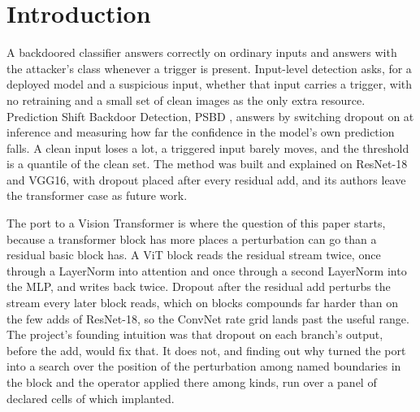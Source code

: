 \documentclass[../main.tex]{subfiles}
\begin{document}
\section{Introduction}

A backdoored classifier answers correctly on ordinary inputs and answers with the attacker's class whenever a trigger is present. Input-level detection asks, for a deployed model and a suspicious input, whether that input carries a trigger, with no retraining and a small set of clean images as the only extra resource. Prediction Shift Backdoor Detection, PSBD \citep{li2025psbd}, answers by switching dropout on at inference and measuring how far the confidence in the model's own prediction falls. A clean input loses a lot, a triggered input barely moves, and the threshold is a quantile of the clean set. The method was built and explained on ResNet-18 and VGG16, with dropout placed after every residual add, and its authors leave the transformer case as future work.

The port to a Vision Transformer is where the question of this paper starts, because a transformer block has more places a perturbation can go than a residual basic block has. A ViT block reads the residual stream twice, once through a LayerNorm into attention and once through a second LayerNorm into the MLP, and writes back twice. Dropout after the residual add perturbs the stream every later block reads, which on \VitBlocks{} blocks compounds far harder than on the few adds of ResNet-18, so the ConvNet rate grid lands past the useful range. The project's founding intuition was that dropout on each branch's output, before the add, would fix that. It does not, and finding out why turned the port into a search over the position of the perturbation among \PositionCount{} named boundaries in the block and the operator applied there among \OperatorCount{} kinds, run over a panel of \PanelCellsTotal{} declared cells of which \PanelCellsClearing{} implanted.
\end{document}
